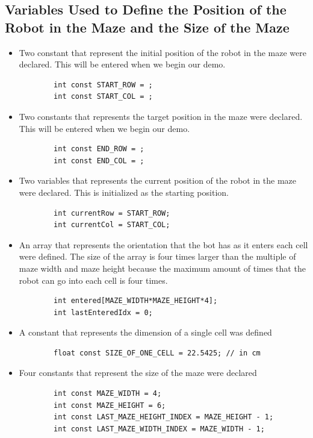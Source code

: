 \documentclass[11pt]{article}
\begin{document}
\subsection{Variables Used to Define the Position of the Robot in the Maze and the Size of the Maze}
\begin{itemize}
\item Two constant that represent the initial position of the robot in the maze were declared. This will be entered when we begin our demo.
	\begin{verbatim}
		int const START_ROW = ;
		int const START_COL = ;
	\end{verbatim} 
\item Two constants that represents the target position in the maze were declared. This will be entered when we begin our demo.
	\begin{verbatim}
		int const END_ROW = ; 
		int const END_COL = ;
	\end{verbatim}
\item Two variables that represents the current position of the robot in the maze were declared. This is  initialized as the starting position. 
	\begin{verbatim}
		int currentRow = START_ROW;
		int currentCol = START_COL;
	\end{verbatim} 
\item An array that represents the orientation that the bot has as it enters each cell were defined. The size of the array is four times larger than the multiple of maze width and maze height because the maximum amount of times that the robot can go into each cell is four times.
	\begin{verbatim}
		int entered[MAZE_WIDTH*MAZE_HEIGHT*4];
		int lastEnteredIdx = 0;
	\end{verbatim} 
\item A constant that represents the dimension of a single cell was defined
	\begin{verbatim}
		float const SIZE_OF_ONE_CELL = 22.5425; // in cm 	
	\end{verbatim} 
\item Four constants that represent the size of the maze were declared
	\begin{verbatim}
		int const MAZE_WIDTH = 4;
		int const MAZE_HEIGHT = 6;
		int const LAST_MAZE_HEIGHT_INDEX = MAZE_HEIGHT - 1;
		int const LAST_MAZE_WIDTH_INDEX = MAZE_WIDTH - 1;
	\end{verbatim} 
\end{itemize}
\newpage
\end{document}
